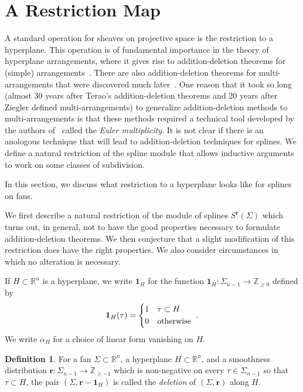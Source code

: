 \documentclass[11pt, reqno]{amsart}
\newcommand{\RR}{\mathbb{R}}
\newcommand{\R}{\mathbb{R}}
\newcommand{\ZZ}{\mathbb{Z}}
\newcommand{\br}{\mathbf{r}}
\theoremstyle{definition}
\newtheorem{definition}[theorem]{Definition}
\theoremstyle{remark}
\numberwithin{equation}{section}
\begin{document}
\section{A Restriction Map}

A standard operation for sheaves on projective space is the restriction to a hyperplane.  This operation is of fundamental importance in the theory of hyperplane arrangements, where it gives rise to addition-deletion theorems for (simple) arrangements~\cite{Terao-Arrangements-of-hyperplanes-I,Terao-Arrangements-of-hyperplanes-II}.  There are also addition-deletion theorems for multi-arrangements that were discovered much later~\cite{Abe-Terao-Wakefield-Euler-2008}.  One reason that it took so long (almost 30 years after Terao's addition-deletion theorems and 20 years after Ziegler defined multi-arrangements) to generalize addition-deletion methods to multi-arrangements is that these methods required a technical tool developed by the authors of~\cite{Abe-Terao-Wakefield-Euler-2008} called the \textit{Euler multiplicity}.  It is not clear if there is an anologous technique that will lead to addition-deletion techniques for splines.  We define a natural restriction of the spline module that allows inductive arguments to work on some classes of subdivision.

In this section, we discuss what restriction to a hyperplane looks like for splines on fans.

We first describe a natural restriction of the module of splines $S^{\br}(\Sigma)$ which turns out, in general, not to have the good properties necessary to formulate addition-deletion theorems.  We then conjecture that a slight modification of this restriction does have the right properties.  We also consider circumstances in which no alteration is necessary.

If $H\subset\R^n$ is a hyperplane, we write $\mathbf{1}_H$ for the function $\mathbf{1}_H: \Sigma_{n-1}\to\ZZ_{\ge 0}$ defined by
\[
\mathbf{1}_H(\tau)=
\begin{cases*}
1 & $\tau\subset H$\\
0 &\mbox{otherwise}
\end{cases*}.
\]
We write $\alpha_H$ for a choice of linear form vanishing on $H$.

\begin{definition}
For a fan $\Sigma\subset\RR^n$, a hyperplane $H\subset\RR^n$, and a smoothness distribution $\br:\Sigma_{n-1}\to \ZZ_{\ge -1}$ which is non-negative on every $\tau\in\Sigma_{n-1}$ so that $\tau\subset H$, the pair $(\Sigma,\br-\mathbf{1}_{H})$ is called the \textit{deletion} of $(\Sigma,\br)$ along $H$.
\end{definition}
\end{document}
